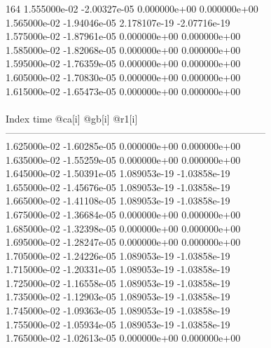 164	1.555000e-02	-2.00327e-05	0.000000e+00	0.000000e+00	\\ 	1.565000e-02	-1.94046e-05	2.178107e-19	-2.07716e-19	\\ 	1.575000e-02	-1.87961e-05	0.000000e+00	0.000000e+00	\\ 	1.585000e-02	-1.82068e-05	0.000000e+00	0.000000e+00	\\ 	1.595000e-02	-1.76359e-05	0.000000e+00	0.000000e+00	\\ 	1.605000e-02	-1.70830e-05	0.000000e+00	0.000000e+00	\\ 	1.615000e-02	-1.65473e-05	0.000000e+00	0.000000e+00	\\ \hline
\\ \hline
Index   time            @ca[i]          @gb[i]          @r1[i]          \\ \hline
--------------------------------------------------------------------------------\\ 	1.625000e-02	-1.60285e-05	0.000000e+00	0.000000e+00	\\ 	1.635000e-02	-1.55259e-05	0.000000e+00	0.000000e+00	\\ 	1.645000e-02	-1.50391e-05	1.089053e-19	-1.03858e-19	\\ 	1.655000e-02	-1.45676e-05	1.089053e-19	-1.03858e-19	\\ 	1.665000e-02	-1.41108e-05	1.089053e-19	-1.03858e-19	\\ 	1.675000e-02	-1.36684e-05	0.000000e+00	0.000000e+00	\\ 	1.685000e-02	-1.32398e-05	0.000000e+00	0.000000e+00	\\ 	1.695000e-02	-1.28247e-05	0.000000e+00	0.000000e+00	\\ 	1.705000e-02	-1.24226e-05	1.089053e-19	-1.03858e-19	\\ 	1.715000e-02	-1.20331e-05	1.089053e-19	-1.03858e-19	\\ 	1.725000e-02	-1.16558e-05	1.089053e-19	-1.03858e-19	\\ 	1.735000e-02	-1.12903e-05	1.089053e-19	-1.03858e-19	\\ 	1.745000e-02	-1.09363e-05	1.089053e-19	-1.03858e-19	\\ 	1.755000e-02	-1.05934e-05	1.089053e-19	-1.03858e-19	\\ 	1.765000e-02	-1.02613e-05	0.000000e+00	0.000000e+00	\\ \hline
